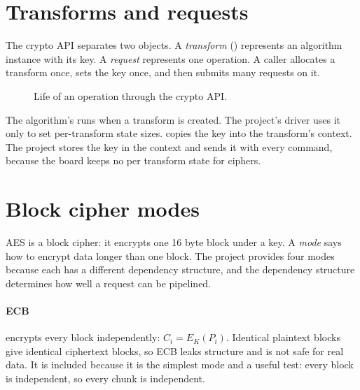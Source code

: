 \section{Transforms and requests}

The crypto API separates two objects. A \emph{transform} () represents an algorithm instance with its key. A \emph{request} represents one operation. A caller allocates a transform once, sets the key once, and then submits many requests on it.

\begin{figure}[ht]
\centering
{}
\caption{Life of an operation through the crypto API.}
\end{figure}

The algorithm's  runs when a transform is created. The project's driver uses it only to set per-transform state sizes.  copies the key into the transform's context. The project stores the key in the context and sends it with every command, because the board keeps no per transform state for ciphers.

\section{Block cipher modes}

AES is a block cipher: it encrypts one 16 byte block under a key. A \emph{mode} says how to encrypt data longer than one block. The project provides four modes because each has a different dependency structure, and the dependency structure determines how well a request can be pipelined.

\paragraph{ECB} encrypts every block independently: $C_i = E_K(P_i)$. Identical plaintext blocks give identical ciphertext blocks, so ECB leaks structure and is not safe for real data. It is included because it is the simplest mode and a useful test: every block is independent, so every chunk is independent.

